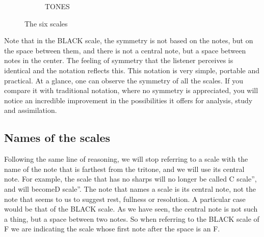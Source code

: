 \documentclass[]{report}
\begin{document}
\begin{figure}[H]
\begin{subfigure}{0.15\textwidth}
\end{subfigure}
\hfill
\begin{subfigure}{0.15\textwidth}
\centering
{}   
\caption{\textsf{TONES}}

\end{subfigure}
\hfill
\caption{The six scales}\label{fig:the-six-scales}
\end{figure}
Note that in the \textsf{BLACK} scale, the symmetry is not based on the notes, but on the space between them, and there is not a central note, but a space between notes in the center. The feeling of symmetry that the listener perceives is identical and the notation reflects this.
This notation is very simple, portable and practical. At a glance, one can observe the symmetry of all the scales. If you compare it with traditional notation, where no symmetry is appreciated, you will notice an incredible improvement in the possibilities it offers for analysis, study and assimilation.
\subsection{Names of the scales}
Following the same line of reasoning, we will stop referring to a scale with the name of the note that is farthest from the tritone, and we will use its central note. For example, the scale that has no sharps will no longer be called C scale'', and will becomeD scale''. The note that names a scale is its central note, not the note that seems to us to suggest rest, fullness or resolution.
A particular case would be that of the \textsf{BLACK} scale. As we have seen, the central note is not such a thing, but a space between two notes. So when referring to the \textsf{BLACK} scale of F we are indicating the scale whose first note after the space is an F.
\end{document}
